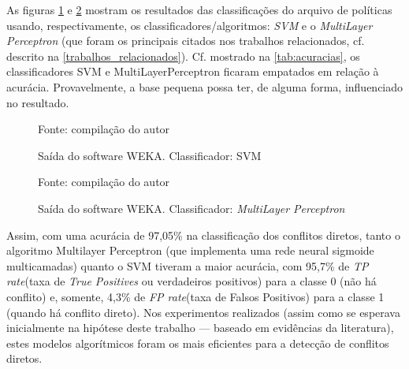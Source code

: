 As figuras \ref{fig:saida_svm} e \ref{fig:saida_multilayerperceptron} mostram os resultados das classificações do arquivo de políticas usando, respectivamente, os classificadores/algoritmos: \textit{SVM} e o \textit{MultiLayer Perceptron} (que foram os principais citados nos trabalhos relacionados, cf. descrito na \autoref{trabalhos_relacionados}). Cf. mostrado na \autoref{tab:acuracias}, os classificadores SVM e MultiLayerPerceptron ficaram empatados em relação à acurácia. Provavelmente, a base pequena possa ter, de alguma forma, influenciado no resultado.
\begin{figure}[h!]
	\centering
	\caption{Saída do software WEKA. Classificador: SVM}

	\label{fig:saida_svm}
	{\scriptsize Fonte: compilação do autor}
\end{figure}
\begin{figure}[h!]
	\centering
	\caption{Saída do software WEKA. Classificador: \textit{MultiLayer Perceptron}}
 
	\label{fig:saida_multilayerperceptron}
	{\scriptsize Fonte: compilação do autor}
\end{figure}

Assim, com uma acurácia de 97,05\% na classificação dos conflitos diretos, tanto o algoritmo Multilayer Perceptron (que implementa uma rede neural sigmoide multicamadas) quanto o SVM tiveram a maior acurácia, com 95,7\% de \textit{TP rate}(taxa de \textit{True Positives} ou verdadeiros positivos) para a classe 0 (não há conflito) e, somente, 4,3\% de \textit{FP rate}(taxa de Falsos Positivos) para a classe 1 (quando há conflito direto). Nos experimentos realizados (assim como se esperava inicialmente na hipótese deste trabalho --- baseado em evidências da literatura), estes modelos algorítmicos foram os mais eficientes para a detecção de conflitos diretos.

